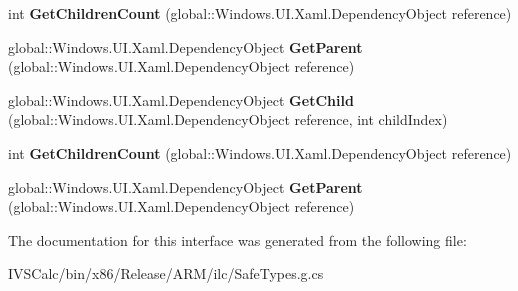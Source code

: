 \begin{DoxyCompactItemize}
\item 
\mbox{\label{interface_windows_1_1_u_i_1_1_xaml_1_1_media_1_1_i_visual_tree_helper_statics_a19a9de9748e05ab7dafe6fb4c77aa8c4}} 
int {\bfseries Get\+Children\+Count} (global\+::\+Windows.\+U\+I.\+Xaml.\+Dependency\+Object reference)
\item 
\mbox{\label{interface_windows_1_1_u_i_1_1_xaml_1_1_media_1_1_i_visual_tree_helper_statics_afa2a74a737472e8406e293600f259a5d}} 
global\+::\+Windows.\+U\+I.\+Xaml.\+Dependency\+Object {\bfseries Get\+Parent} (global\+::\+Windows.\+U\+I.\+Xaml.\+Dependency\+Object reference)
\item 
\mbox{\label{interface_windows_1_1_u_i_1_1_xaml_1_1_media_1_1_i_visual_tree_helper_statics_a00c15dcff89839a4bacfb9de1747f0ad}} 
global\+::\+Windows.\+U\+I.\+Xaml.\+Dependency\+Object {\bfseries Get\+Child} (global\+::\+Windows.\+U\+I.\+Xaml.\+Dependency\+Object reference, int child\+Index)
\item 
\mbox{\label{interface_windows_1_1_u_i_1_1_xaml_1_1_media_1_1_i_visual_tree_helper_statics_a19a9de9748e05ab7dafe6fb4c77aa8c4}} 
int {\bfseries Get\+Children\+Count} (global\+::\+Windows.\+U\+I.\+Xaml.\+Dependency\+Object reference)
\item 
\mbox{\label{interface_windows_1_1_u_i_1_1_xaml_1_1_media_1_1_i_visual_tree_helper_statics_afa2a74a737472e8406e293600f259a5d}} 
global\+::\+Windows.\+U\+I.\+Xaml.\+Dependency\+Object {\bfseries Get\+Parent} (global\+::\+Windows.\+U\+I.\+Xaml.\+Dependency\+Object reference)
\end{DoxyCompactItemize}


The documentation for this interface was generated from the following file\+:\begin{DoxyCompactItemize}
\item 
I\+V\+S\+Calc/bin/x86/\+Release/\+A\+R\+M/ilc/Safe\+Types.\+g.\+cs\end{DoxyCompactItemize}

